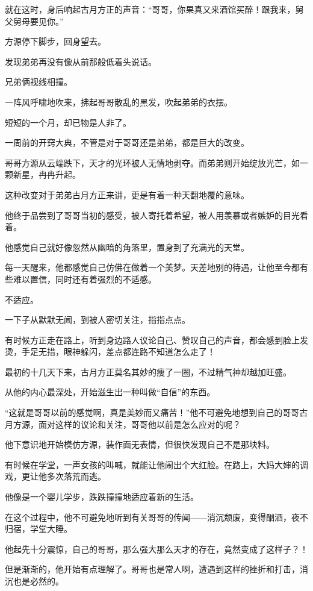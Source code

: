 \begin{this_body}
就在这时，身后响起古月方正的声音：“哥哥，你果真又来酒馆买醉！跟我来，舅父舅母要见你。”

方源停下脚步，回身望去。

发现弟弟再没有像从前那般低着头说话。

兄弟俩视线相撞。

一阵风呼啸地吹来，拂起哥哥散乱的黑发，吹起弟弟的衣摆。

短短的一个月，却已物是人非了。

一周前的开窍大典，不管是对于哥哥还是弟弟，都是巨大的改变。

哥哥方源从云端跌下，天才的光环被人无情地剥夺。而弟弟则开始绽放光芒，如一颗新星，冉冉升起。

这种改变对于弟弟古月方正来讲，更是有着一种天翻地覆的意味。

他终于品尝到了哥哥当初的感受，被人寄托着希望，被人用羡慕或者嫉妒的目光看着。

他感觉自己就好像忽然从幽暗的角落里，置身到了充满光的天堂。

每一天醒来，他都感觉自己仿佛在做着一个美梦。天差地别的待遇，让他至今都有些难以置信，同时还有着强烈的不适感。

不适应。

一下子从默默无闻，到被人密切关注，指指点点。

有时候方正走在路上，听到身边路人议论自己、赞叹自己的声音，都会感到脸上发烫，手足无措，眼神躲闪，差点都连路不知道怎么走了！

最初的十几天下来，古月方正莫名其妙的瘦了一圈，不过精气神却越加旺盛。

从他的内心最深处，开始滋生出一种叫做“自信”的东西。

“这就是哥哥以前的感觉啊，真是美妙而又痛苦！”他不可避免地想到自己的哥哥古月方源，面对这样的议论和关注，哥哥他以前是怎么应对的呢？

他下意识地开始模仿方源，装作面无表情，但很快发现自己不是那块料。

有时候在学堂，一声女孩的叫喊，就能让他闹出个大红脸。在路上，大妈大婶的调戏，更让他多次落荒而逃。

他像是一个婴儿学步，跌跌撞撞地适应着新的生活。

在这个过程中，他不可避免地听到有关哥哥的传闻——消沉颓废，变得酗酒，夜不归宿，学堂大睡。

他起先十分震惊，自己的哥哥，那么强大那么天才的存在，竟然变成了这样子？！

但是渐渐的，他开始有点理解了。哥哥也是常人啊，遭遇到这样的挫折和打击，消沉也是必然的。


\end{this_body}
